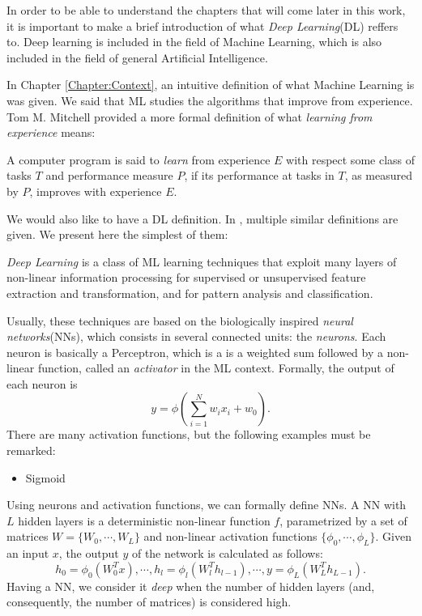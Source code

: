 \label{Chapter:Introduction:DL}

In order to be able to understand the chapters that will come later in this work, it is important to make a brief introduction of what \emph{Deep Learning}(DL) reffers to. Deep learning is included in the field of Machine Learning, which is also included in the field of general Artificial Intelligence.

In Chapter \ref{Chapter:Context}, an intuitive definition of what Machine Learning is was given. We said that ML studies the algorithms that improve from experience. Tom M. Mitchell \citep{mitchell_machine_1997} provided a more formal definition of what \emph{learning from experience} means:

\begin{ndef}
A computer program is said to \emph{learn} from experience $E$ with respect some class of tasks $T$ and performance measure $P$, if its performance at tasks in $T$, as measured by $P$, improves with experience $E$.
\end{ndef}

We would also like to have a DL definition. In \cite{deng_deep_2014}, multiple similar definitions are given. We present here the simplest of them:

\begin{ndef}
\emph{Deep Learning} is a class of ML learning techniques that exploit many layers of non-linear information processing for supervised or unsupervised feature extraction and transformation, and for pattern analysis and classification.
\end{ndef}

Usually, these techniques are based on the biologically inspired \emph{neural networks}(NNs), which consists in several connected units: the \emph{neurons}. Each neuron is basically a Perceptron, which is a is a weighted sum followed by a non-linear function, called an \emph{activator} in the ML context. Formally, the output of each neuron is 
\[
y = \phi(\sum_{i = 1}^N w_i x_i  + w_0) .   
\]
There are many activation functions, but the following examples must be remarked:
\begin{itemize}
\item Sigmoid 
\end{itemize}

Using neurons and activation functions, we can formally define NNs. A NN with $L$ hidden layers is a deterministic non-linear function $f$, parametrized by a set of matrices $W = \{W_0,\cdots,W_L\}$ and non-linear activation functions $\{\phi_0,\cdots,\phi_L\}$. Given an input $x$, the output $y$ of the network is calculated as follows:
\[
h_0 = \phi_0(W_0^Tx), \cdots, h_l = \phi_l(W_l^T h_{l-1}),\cdots, y = \phi_L(W_L^T h_{L-1}).
\]
Having a NN, we consider it \emph{deep} when the number of hidden layers (and, consequently, the number of matrices) is considered high. 


